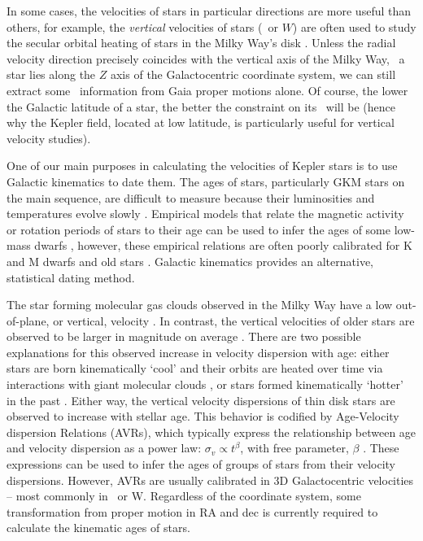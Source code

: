 In some cases, the velocities of stars in particular directions are more
useful than others, for example, the {\it vertical} velocities of stars (\vz\
or $W$) are often used to study the secular orbital heating of stars in the
Milky Way's disk \citep[\eg][]{ting2019, beane2018, yu2018, citations}.
Unless the radial velocity direction precisely coincides with the vertical
axis of the Milky Way, \ie\ a star lies along the $Z$ axis of the
Galactocentric coordinate system, we can still extract some \vz\ information
from Gaia proper motions alone.
Of course, the lower the Galactic latitude of a star, the better the
constraint on its \vz\ will be (hence why the Kepler field, located at low
latitude, is particularly useful for vertical velocity studies).

One of our main purposes in calculating the velocities of Kepler stars is to
use Galactic kinematics to date them.
The ages of stars, particularly GKM stars on the main sequence, are difficult
to measure because their luminosities and temperatures evolve slowly
\citep[see][for a review of stellar ages]{soderblom2010}.
Empirical models that relate the magnetic activity or rotation periods of
stars to their age can be used to infer the ages of some low-mass dwarfs
\citep{citations}, however, these empirical relations are often poorly
calibrated for K and M dwarfs and old stars \citep{citations}.
Galactic kinematics provides an alternative, statistical dating method.

The star forming molecular gas clouds observed in the Milky Way have a low
out-of-plane, or vertical, velocity \citep[\eg][]{stark1989, stark2005,
aumer2009, martig2014, aumer2016}.
In contrast, the vertical velocities of older stars are observed to be larger
in magnitude on average \citep{stromberg1946, wielen1977, nordstrom2004,
holmberg2007, holmberg2009, aumer2009, casagrande2011, ting2019, yu2018}.
There are two possible explanations for this observed increase in velocity
dispersion with age: either stars are born kinematically `cool' and their
orbits are heated over time via interactions with giant molecular clouds
\citep[see][for a review of secular evolution in the MW]{sellwood2014}, or
stars formed kinematically `hotter' in the past \citep[\eg][]{bird2013}.
Either way, the vertical velocity dispersions of thin disk stars are observed
to increase with stellar age.
This behavior is codified by Age-Velocity dispersion Relations (AVRs), which
typically express the relationship between age and velocity dispersion as a
power law: $\sigma_v \propto t^\beta$, with free parameter, $\beta$
\citep[\eg][]{holmberg2009, yu2018}.
These expressions can be used to infer the ages of groups of stars from their
velocity dispersions.
However, AVRs are usually calibrated in 3D Galactocentric velocities -- most
commonly in \vz\ or W.
Regardless of the coordinate system, some transformation from proper motion in
RA and dec is currently required to calculate the kinematic ages of stars.

